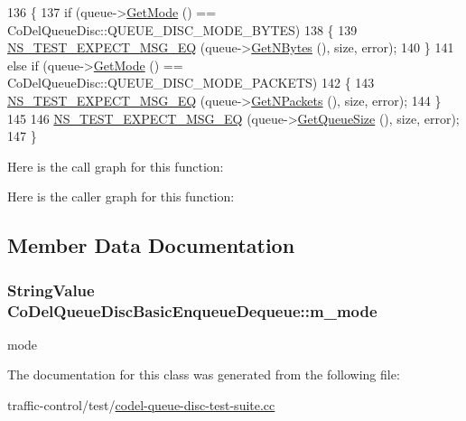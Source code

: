 \begin{DoxyCode}
136   \{
137     \textcolor{keywordflow}{if} (queue->\hyperlink{classns3_1_1CoDelQueueDisc_ab4e1b3733d0961c823b6fa7d2e36c0bb}{GetMode} () == CoDelQueueDisc::QUEUE\_DISC\_MODE\_BYTES)
138       \{
139         \hyperlink{group__testing_ga7304ba46a28d8cf08dfdfd6499cf7068}{NS\_TEST\_EXPECT\_MSG\_EQ} (queue->\hyperlink{classns3_1_1QueueDisc_ac87d3bbf7381d64808f6764bdfd812e5}{GetNBytes} (), size, error);
140       \}
141     \textcolor{keywordflow}{else} \textcolor{keywordflow}{if} (queue->\hyperlink{classns3_1_1CoDelQueueDisc_ab4e1b3733d0961c823b6fa7d2e36c0bb}{GetMode} () == CoDelQueueDisc::QUEUE\_DISC\_MODE\_PACKETS)
142       \{
143         \hyperlink{group__testing_ga7304ba46a28d8cf08dfdfd6499cf7068}{NS\_TEST\_EXPECT\_MSG\_EQ} (queue->\hyperlink{classns3_1_1QueueDisc_a6ee992f32c1671512f0948fd6cc46a7e}{GetNPackets} (), size, error);
144       \}
145 
146     \hyperlink{group__testing_ga7304ba46a28d8cf08dfdfd6499cf7068}{NS\_TEST\_EXPECT\_MSG\_EQ} (queue->\hyperlink{classns3_1_1CoDelQueueDisc_a2eed623615f381b9c377ed7add064953}{GetQueueSize} (), size, error);
147   \}
\end{DoxyCode}


Here is the call graph for this function\+:




Here is the caller graph for this function\+:




\subsection{Member Data Documentation}
\subsubsection[{\texorpdfstring{m\+\_\+mode}{m_mode}}]{\setlength{\rightskip}{0pt plus 5cm}String\+Value Co\+Del\+Queue\+Disc\+Basic\+Enqueue\+Dequeue\+::m\+\_\+mode\hspace{0.3cm}{\ttfamily [private]}}\hypertarget{classCoDelQueueDiscBasicEnqueueDequeue_a8fbc5f104a809347a06d9103b996170d}{}\label{classCoDelQueueDiscBasicEnqueueDequeue_a8fbc5f104a809347a06d9103b996170d}


mode 



The documentation for this class was generated from the following file\+:\begin{DoxyCompactItemize}
\item 
traffic-\/control/test/\hyperlink{codel-queue-disc-test-suite_8cc}{codel-\/queue-\/disc-\/test-\/suite.\+cc}\end{DoxyCompactItemize}
